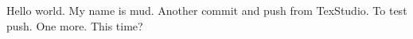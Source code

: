 Hello world.
My name is mud. 
Another commit and push from TexStudio.
To test push.
One more. 
This time?